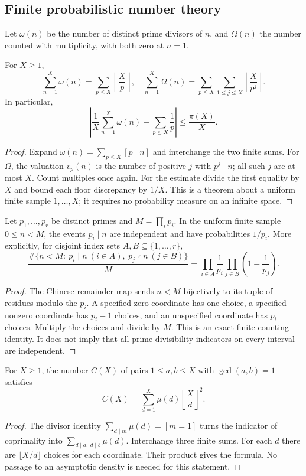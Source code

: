 \subsection{Finite probabilistic number theory}
Let $\omega(n)$ be the number of distinct prime divisors of $n$, and $\Omega(n)$ the number counted with multiplicity, with both zero at $n=1$.

\begin{theorem}\label{an:means}
For $X\ge1$,
\[
 \sum_{n=1}^{X}\omega(n)=\sum_{p\le X}\left\lfloor\frac Xp\right\rfloor,
 \quad
 \sum_{n=1}^{X}\Omega(n)=\sum_{p\le X}\sum_{1\le j\le X}
            \left\lfloor\frac X{p^j}\right\rfloor.
\]
In particular,
\[
 \left|\frac1X\sum_{n=1}^{X}\omega(n)-\sum_{p\le X}\frac1p\right|
 \le\frac{\pi(X)}X.
\]
\end{theorem}
\begin{proof}
Expand $\omega(n)=\sum_{p\le X}[p\mid n]$ and interchange the two finite sums. For $\Omega$, the valuation $v_p(n)$ is the number of positive $j$ with $p^j\mid n$; all such $j$ are at most $X$. Count multiples once again. For the estimate divide the first equality by $X$ and bound each floor discrepancy by $1/X$. This is a theorem about a uniform finite sample $1,\ldots,X$; it requires no probability measure on an infinite space.
\end{proof}

\begin{theorem}\label{an:independence}
Let $p_1,\ldots,p_r$ be distinct primes and $M=\prod_i p_i$. In the uniform finite sample $0\le n<M$, the events $p_i\mid n$ are independent and have probabilities $1/p_i$. More explicitly, for disjoint index sets $A,B\subseteq\{1,\ldots,r\}$,
\[
 \frac{\#\{n<M:\ p_i\mid n\ (i\in A),\ p_j\nmid n\ (j\in B)\}}M
 =\prod_{i\in A}\frac1{p_i}\prod_{j\in B}\left(1-\frac1{p_j}\right).
\]
\end{theorem}
\begin{proof}
The Chinese remainder map sends $n<M$ bijectively to its tuple of residues modulo the $p_i$. A specified zero coordinate has one choice, a specified nonzero coordinate has $p_i-1$ choices, and an unspecified coordinate has $p_i$ choices. Multiply the choices and divide by $M$. This is an exact finite counting identity. It does not imply that all prime-divisibility indicators on every interval are independent.
\end{proof}

\begin{theorem}\label{an:coprimepairs}
For $X\ge1$, the number $C(X)$ of pairs $1\le a,b\le X$ with $\gcd(a,b)=1$ satisfies
\[
 C(X)=\sum_{d=1}^X\mu(d)\left\lfloor\frac Xd\right\rfloor^2.
\]
\end{theorem}
\begin{proof}
The divisor identity $\sum_{d\mid m}\mu(d)=[m=1]$ turns the indicator of coprimality into $\sum_{d\mid a,\ d\mid b}\mu(d)$. Interchange three finite sums. For each $d$ there are $\lfloor X/d\rfloor$ choices for each coordinate. Their product gives the formula. No passage to an asymptotic density is needed for this statement.
\end{proof}
